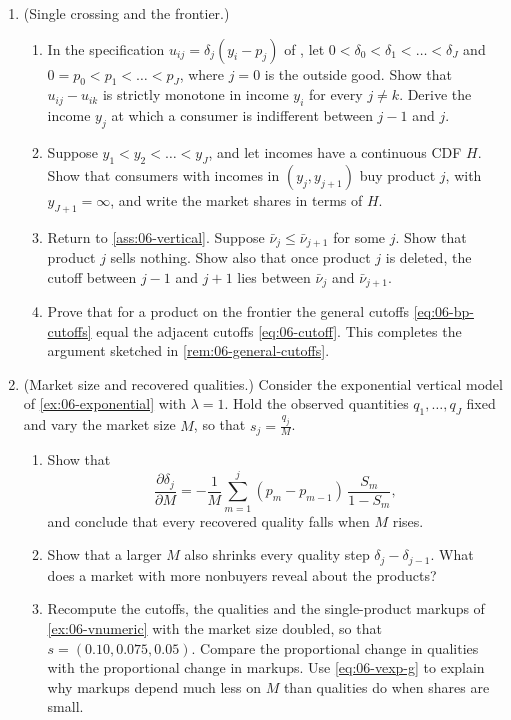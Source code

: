 \begin{enumerate}[label=\arabic*., leftmargin=*, itemsep=6pt]

\item (Single crossing and the frontier.)
\begin{enumerate}[label=(\alph*)]
  \item In the specification $u_{ij} = \delta_j(y_i - p_j)$ of \citet{GabszewiczThisse1979}, let
  $0 < \delta_0 < \delta_1 < \dots < \delta_J$ and $0 = p_0 < p_1 < \dots < p_J$, where $j = 0$ is the outside good.
  Show that $u_{ij} - u_{ik}$ is strictly monotone in income $y_i$ for every $j \ne k$. Derive the income $y_j$ at
  which a consumer is indifferent between $j - 1$ and $j$.
  \item Suppose $y_1 < y_2 < \dots < y_J$, and let incomes have a continuous CDF $H$. Show that consumers with incomes
  in $(y_j, y_{j+1})$ buy product $j$, with $y_{J+1} = \infty$, and write the market shares in terms of $H$.
  \item Return to \cref{ass:06-vertical}. Suppose $\bar\nu_j \le \bar\nu_{j+1}$ for some $j$. Show that product $j$
  sells nothing. Show also that once product $j$ is deleted, the cutoff between $j - 1$ and $j + 1$ lies between
  $\bar\nu_j$ and $\bar\nu_{j+1}$.
  \item Prove that for a product on the frontier the general cutoffs \eqref{eq:06-bp-cutoffs} equal the adjacent
  cutoffs \eqref{eq:06-cutoff}. This completes the argument sketched in \cref{rem:06-general-cutoffs}.
\end{enumerate}

\item (Market size and recovered qualities.) Consider the exponential vertical model of \cref{ex:06-exponential}
with $\lambda = 1$. Hold the observed quantities $q_1, \dots, q_J$ fixed and vary the market size $M$, so that
$s_j = \frac{q_j}{M}$.
\begin{enumerate}[label=(\alph*)]
  \item Show that
  \begin{equation*}
    \frac{\partial\delta_j}{\partial M} = -\frac{1}{M}\sum_{m=1}^{j}(p_m - p_{m-1})\,\frac{S_m}{1 - S_m},
  \end{equation*}
  and conclude that every recovered quality falls when $M$ rises.
  \item Show that a larger $M$ also shrinks every quality step $\delta_j - \delta_{j-1}$. What does a market with more
  nonbuyers reveal about the products?
  \item Recompute the cutoffs, the qualities and the single-product markups of \cref{ex:06-vnumeric} with the market
  size doubled, so that $s = (0.10, 0.075, 0.05)$. Compare the proportional change in qualities with the proportional
  change in markups. Use \eqref{eq:06-vexp-g} to explain why markups depend much less on $M$ than qualities do when
  shares are small.
\end{enumerate}


\end{enumerate}
